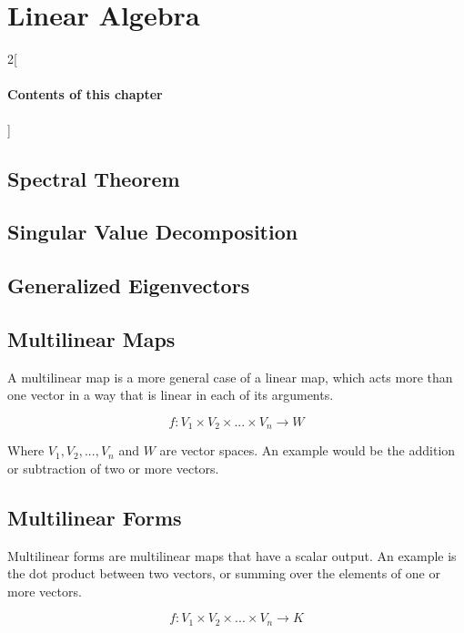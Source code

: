 \chapter{Linear Algebra}

\begin{multicols}{2}[\subsubsection*{Contents of this chapter}]
\end{multicols}

\section{Spectral Theorem}

\section{Singular Value Decomposition}

\section{Generalized Eigenvectors}

\section{Multilinear Maps}

A multilinear map is a more general case of a linear map, which acts more than one vector in a way that is linear in each of its arguments.

\begin{equation}	
f: V_1 \times V_2 \times ... \times V_n \rightarrow W
\end{equation}

Where $V_1, V_2, ... , V_n$ and $W$ are vector spaces. An example would be the addition or subtraction of two or more vectors.

\section{Multilinear Forms}
Multilinear forms are multilinear maps that have a scalar output. An example is the dot product between two vectors, or summing over the elements of one or more vectors.

\begin{equation}
f: V_1 \times V_2 \times ... \times V_n \rightarrow K
\end{equation}

